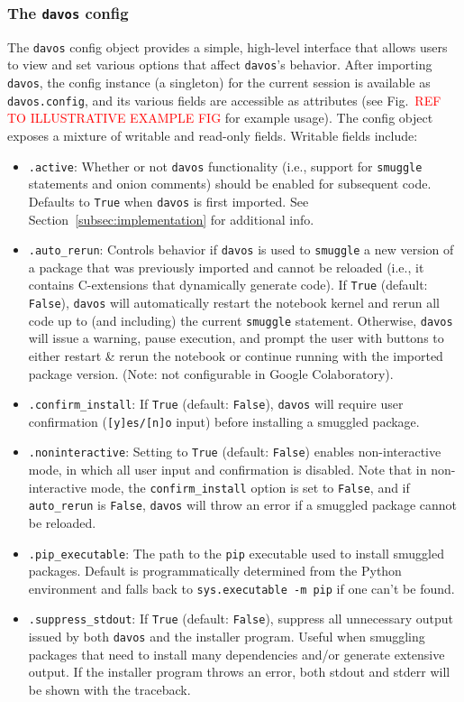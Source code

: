 \documentclass[preprint,12pt,a4paper]{elsarticle}
\begin{document}
\subsubsection{The \texttt{davos} config}\label{subsec:config}
The \texttt{davos} config object provides a simple, high-level interface that allows users to view and set various options that affect \texttt{davos}'s behavior. After importing \texttt{davos}, the config instance (a singleton) for the current session is available as \texttt{davos.config}, and its various fields are accessible as attributes (see Fig.~\textcolor{red}{REF TO ILLUSTRATIVE EXAMPLE FIG} for example usage). The config object exposes a mixture of writable and read-only fields. Writable fields include:
\begin{itemize}
\item \texttt{.active}: Whether or not \texttt{davos} functionality (i.e., support for \texttt{smuggle} statements and onion comments) should be enabled for subsequent code. Defaults to \texttt{True} when \texttt{davos} is first imported. See Section~\ref{subsec:implementation} for additional info.
\item \texttt{.auto\_rerun}: Controls behavior if \texttt{davos} is used to \texttt{smuggle} a new version of a package that was previously imported and cannot be reloaded (i.e., it contains C-extensions that dynamically generate code). If \texttt{True} (default: \texttt{False}), \texttt{davos} will automatically restart the notebook kernel and rerun all code up to (and including) the current \texttt{smuggle} statement. Otherwise, \texttt{davos} will issue a warning, pause execution, and prompt the user with buttons to either restart \& rerun the notebook or continue running with the imported package version. (Note: not configurable in Google Colaboratory).
\item \texttt{.confirm\_install}: If \texttt{True} (default: \texttt{False}), \texttt{davos} will require user confirmation (\texttt{[y]es/[n]o} input) before installing a smuggled package.
\item \texttt{.noninteractive}: Setting to \texttt{True} (default: \texttt{False}) enables non-interactive mode, in which all user input and confirmation is disabled. Note that in non-interactive mode, the \texttt{confirm\_install} option is set to \texttt{False}, and if \texttt{auto\_rerun} is \texttt{False}, \texttt{davos} will throw an error if a smuggled package cannot be reloaded.
\item \texttt{.pip\_executable}: The path to the \texttt{pip} executable used to install smuggled packages. Default is programmatically determined from the Python environment and falls back to \texttt{sys.executable -m pip} if one can't be found.
\item \texttt{.suppress\_stdout}: If \texttt{True} (default: \texttt{False}), suppress all unnecessary output issued by both \texttt{davos} and the installer program. Useful when smuggling packages that need to install many dependencies and/or generate extensive output. If the installer program throws an error, both stdout and stderr will be shown with the traceback.
\end{itemize}
\end{document}
